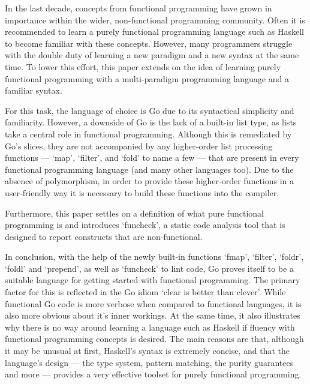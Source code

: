

In the last decade, concepts from functional programming have grown in
importance within the wider, non-functional programming community.
Often it is recommended to learn a purely functional programming language
such as Haskell to become familiar with these concepts.
However, many programmers struggle with the double duty
of learning a new paradigm and a new syntax at the same time. To lower this
effort, this paper extends on the idea of learning purely functional programming
with a multi-paradigm programming language and a familiar syntax.

For this task, the language of choice is Go due to its syntactical
simplicity and familiarity.
However, a downside of Go is the lack of a built-in list type, as lists take a
central role in functional programming. Although this is remediated by Go's slices,
they are not accompanied by any higher-order list processing functions --- `map', `filter', and `fold' to name a
few --- that are present in every functional programming language (and many
other languages too).
Due to the absence of polymorphism, in order to provide these higher-order functions in
a user-friendly way it is necessary to build these functions into the compiler.

Furthermore, this paper settles on a definition of what pure functional programming is and
introduces `funcheck', a static code analysis tool that is designed to
report constructs that are non-functional.

In conclusion, with the help of the newly built-in functions `fmap', `filter', `foldr', `foldl' and
`prepend', as well as `funcheck' to lint code, Go proves itself to be a
suitable language for getting started with functional programming.
The primary factor for this is reflected in the Go idiom `clear is better than clever'.
While functional Go code is more verbose when compared to functional languages, it
is also more obvious about it's inner workings.
At the same time, it also illustrates why there is no way around learning a
language such as Haskell if fluency with functional programming concepts
is desired. The main reasons are that, although it may be unusual at first, Haskell's
syntax is extremely concise, and that the language's design --- the type system,
pattern matching, the purity guarantees and more --- provides a very effective toolset
for purely functional programming.
